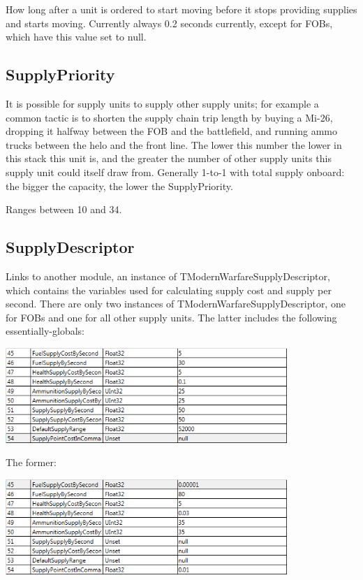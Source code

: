 \documentclass{article}
\begin{document}
How long after a unit is ordered to start moving before it stops providing supplies and starts moving. Currently always 0.2 seconds currently, except for FOBs, which have this value set to null.

\subsection{SupplyPriority}

It is possible for supply units to supply other supply units; for example a common tactic is to shorten the supply chain trip length by buying a Mi-26, dropping it halfway between the FOB and the battlefield, and running ammo trucks between the helo and the front line. The lower this number the lower in this stack this unit is, and the greater the number of other supply units this supply unit could itself draw from. Generally 1-to-1 with total supply onboard: the bigger the capacity, the lower the SupplyPriority.

Ranges between 10 and 34.

\subsection{SupplyDescriptor}

Links to another module, an instance of TModernWarfareSupplyDescriptor, which contains the variables used for calculating supply cost and supply per second. There are only two instances of TModernWarfareSupplyDescriptor, one for FOBs and one for all other supply units. The latter includes the following essentially-globals:

\includegraphics[width=0.8\textwidth]{screenshot_supply}

The former:

\includegraphics[width=0.8\textwidth]{screenshot_supply_fob}
\end{document}
